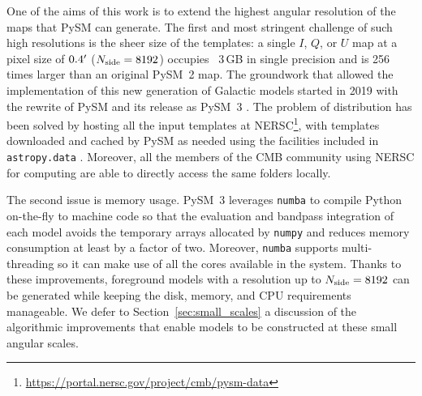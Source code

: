 \documentclass[twocolumn]{aastex631}
\begin{document}
One of the aims of this work is to extend the highest angular resolution of the maps that PySM can generate. The first and most stringent challenge of such high resolutions is the sheer size of the templates: a single $I$, $Q$, or $U$ map at a pixel size of $0.4\mbox{$^\prime$}$ ($N_{\rm side}=8192$) occupies ~3\,GB in single precision and is 256 times larger than an original PySM~2 map. The groundwork that allowed the implementation of this new generation of Galactic models started in 2019 with the rewrite of PySM and its release as PySM~3 \citep[see][for details]{Zonca:2021}. The problem of distribution has been solved by hosting all the input templates at NERSC\footnote{\url{https://portal.nersc.gov/project/cmb/pysm-data}}, with templates downloaded and cached by PySM as needed using the facilities included in \texttt{astropy.data} \citep{AstropyCollaboration:2013, AstropyCollaboration:2018}. Moreover, all the members of the CMB community using NERSC for computing are able to directly access the same folders locally.

The second issue is memory usage. PySM~3 leverages \texttt{numba} \citep{Lam:2015} to compile Python on-the-fly to machine code so that the evaluation and bandpass integration of each model avoids the temporary arrays allocated by \texttt{numpy} and reduces memory consumption at least by a factor of two. Moreover, \texttt{numba} supports multi-threading so it can make use of all the cores available in the system. Thanks to these improvements, foreground models with a resolution up to $N_{\rm side}=8192$ can be generated while keeping the disk, memory, and CPU requirements manageable. We defer to Section~\ref{sec:small_scales} a discussion of the algorithmic improvements that enable models to be constructed at these small angular scales.

\end{document}
